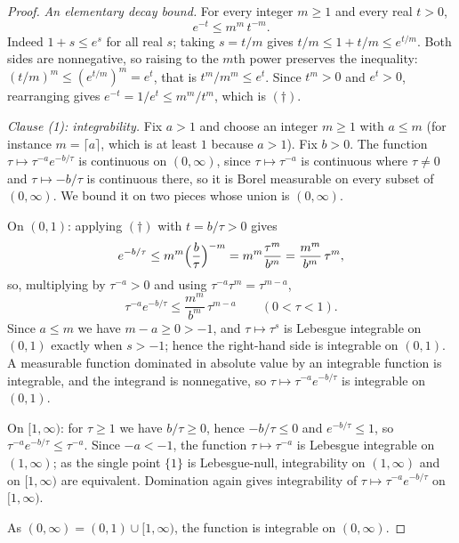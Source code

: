 \begin{proof}
\emph{An elementary decay bound.}  For every integer $m \geq 1$ and every real
$t > 0$,
\begin{equation*}
  e^{-t} \leq m^m\,t^{-m} . \tag{$\dagger$}
\end{equation*}
Indeed $1 + s \leq e^s$ for all real $s$; taking $s = t/m$ gives
$t/m \leq 1 + t/m \leq e^{t/m}$.  Both sides are nonnegative, so raising to the
$m$th power preserves the inequality:
$(t/m)^m \leq (e^{t/m})^m = e^t$, that is $t^m/m^m \leq e^t$.  Since $t^m > 0$
and $e^t > 0$, rearranging gives $e^{-t} = 1/e^t \leq m^m/t^m$, which is
$(\dagger)$.

\emph{Clause (1): integrability.}  Fix $a > 1$ and choose an integer
$m \geq 1$ with $a \leq m$ (for instance $m = \lceil a\rceil$, which is at least
$1$ because $a > 1$).  Fix $b > 0$.  The function
$\tau \mapsto \tau^{-a}e^{-b/\tau}$ is continuous on $(0,\infty)$, since
$\tau \mapsto \tau^{-a}$ is continuous where $\tau \neq 0$ and
$\tau \mapsto -b/\tau$ is continuous there, so it is Borel measurable on every
subset of $(0,\infty)$.  We bound it on two pieces whose union is
$(0,\infty)$.

On $(0,1)$: applying $(\dagger)$ with $t = b/\tau > 0$ gives
\[
  e^{-b/\tau} \leq m^m\Bigl(\frac{b}{\tau}\Bigr)^{-m}
    = m^m\frac{\tau^m}{b^m} = \frac{m^m}{b^m}\,\tau^m ,
\]
so, multiplying by $\tau^{-a} > 0$ and using $\tau^{-a}\tau^m = \tau^{m-a}$,
\[
  \tau^{-a}e^{-b/\tau} \leq \frac{m^m}{b^m}\,\tau^{m-a}
  \qquad (0 < \tau < 1) .
\]
Since $a \leq m$ we have $m - a \geq 0 > -1$, and $\tau \mapsto \tau^{s}$ is
Lebesgue integrable on $(0,1)$ exactly when $s > -1$; hence the right-hand side
is integrable on $(0,1)$.  A measurable function dominated in absolute value by
an integrable function is integrable, and the integrand is nonnegative, so
$\tau \mapsto \tau^{-a}e^{-b/\tau}$ is integrable on $(0,1)$.

On $[1,\infty)$: for $\tau \geq 1$ we have $b/\tau \geq 0$, hence
$-b/\tau \leq 0$ and $e^{-b/\tau} \leq 1$, so
$\tau^{-a}e^{-b/\tau} \leq \tau^{-a}$.  Since $-a < -1$, the function
$\tau \mapsto \tau^{-a}$ is Lebesgue integrable on $(1,\infty)$; as the single
point $\{1\}$ is Lebesgue-null, integrability on $(1,\infty)$ and on
$[1,\infty)$ are equivalent.  Domination again gives integrability of
$\tau \mapsto \tau^{-a}e^{-b/\tau}$ on $[1,\infty)$.

As $(0,\infty) = (0,1) \cup [1,\infty)$, the function is integrable on
$(0,\infty)$.


\end{proof}
